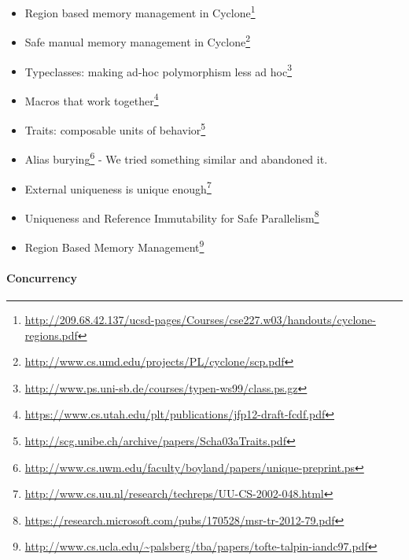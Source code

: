 \documentclass[a4paper,]{book}
\renewcommand{\href}[2]{#2\footnote{\url{#1}}}
\providecommand{\tightlist}{%
  \setlength{\itemsep}{0pt}\setlength{\parskip}{0pt}}
\let\oldparagraph\paragraph
\renewcommand{\paragraph}[1]{\oldparagraph{#1}\mbox{}}
\begin{document}
\begin{itemize}
\tightlist
\item
  \href{http://209.68.42.137/ucsd-pages/Courses/cse227.w03/handouts/cyclone-regions.pdf}{Region
  based memory management in Cyclone}
\item
  \href{http://www.cs.umd.edu/projects/PL/cyclone/scp.pdf}{Safe manual
  memory management in Cyclone}
\item
  \href{http://www.ps.uni-sb.de/courses/typen-ws99/class.ps.gz}{Typeclasses:
  making ad-hoc polymorphism less ad hoc}
\item
  \href{https://www.cs.utah.edu/plt/publications/jfp12-draft-fcdf.pdf}{Macros
  that work together}
\item
  \href{http://scg.unibe.ch/archive/papers/Scha03aTraits.pdf}{Traits:
  composable units of behavior}
\item
  \href{http://www.cs.uwm.edu/faculty/boyland/papers/unique-preprint.ps}{Alias
  burying} - We tried something similar and abandoned it.
\item
  \href{http://www.cs.uu.nl/research/techreps/UU-CS-2002-048.html}{External
  uniqueness is unique enough}
\item
  \href{https://research.microsoft.com/pubs/170528/msr-tr-2012-79.pdf}{Uniqueness
  and Reference Immutability for Safe Parallelism}
\item
  \href{http://www.cs.ucla.edu/~palsberg/tba/papers/tofte-talpin-iandc97.pdf}{Region
  Based Memory Management}
\end{itemize}

\paragraph{Concurrency}\label{concurrency}
\end{document}
